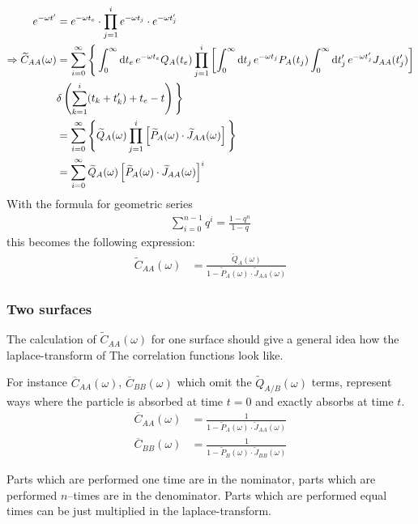 \documentclass[a4paper, parskip=half]{scrartcl}
\newcommand{\diff}{\mathop{}\!\mathrm{d}}
\begin{document}
\begin{align}
e^{-\omega t'} &= e^{-\omega t_e} \cdot \prod_{j=1}^i e^{-\omega t_j} \cdot e^{-\omega t_j'}\\
\Rightarrow  \widetilde{C}_{AA}(\omega) &= \sum_{i=0}^\infty \Bigg\lbrace \int_0^\infty \diff t_e\, e^{-\omega t_e} Q_A(t_e) \prod_{j=1}^i \left[ \int_0^\infty \diff t_j\, e^{-\omega t_j} P_A(t_j) \int_0^\infty \diff t_j'\, e^{-\omega t_j'} J_{AA}(t_j')\right]\notag\\ 
&\delta \left(\sum_{k=1}^i(t_k+t_k') + t_e - t \right) \Bigg\rbrace\\
&= \sum_{i=0}^\infty \Bigg\lbrace \widetilde{Q}_A(\omega) \prod_{j=1}^i \left[\widetilde{P}_A(\omega) \cdot \widetilde{J}_{AA}(\omega) \right]  \Bigg\rbrace \\
&= \sum_{i=0}^\infty \widetilde{Q}_A(\omega) \left[\widetilde{P}_A(\omega) \cdot \widetilde{J}_{AA}(\omega) \right]^i
\end{align}
With the formula for geometric series 
\begin{align}
\sum_{i=0}^{n-1}q^i = \frac{1-q^n}{1-q} 
\end{align}
this becomes the following expression:
\begin{align}
\widetilde{C}_{AA}(\omega) &= \frac{\widetilde{Q}_A(\omega)}{1-\widetilde{P}_A(\omega) \cdot \widetilde{J}_{AA}(\omega)}
\end{align}
\subsubsection{Two surfaces}
The calculation of $\widetilde{C}_{AA}(\omega)$ for one surface should give a general idea how the laplace-transform of The correlation functions look like.

For instance $\overline{C}_{AA}(\omega)$, $\overline{C}_{BB}(\omega)$ which omit the $\widetilde{Q}_{A/B}(\omega)$ terms, represent ways where the particle is absorbed at time $t=0$ and exactly absorbs at time $t$. 
\begin{align}
\overline{C}_{AA}(\omega) &= \frac{1}{1-\widetilde{P}_A(\omega) \cdot \widetilde{J}_{AA}(\omega)} \\
\overline{C}_{BB}(\omega) &= \frac{1}{1-\widetilde{P}_B(\omega) \cdot \widetilde{J}_{BB}(\omega)} 
\end{align}

Parts which are performed one time are in the nominator, parts which are performed $n$--times are in the denominator. Parts which are performed equal times can be just multiplied in the laplace-transform.
\end{document}
